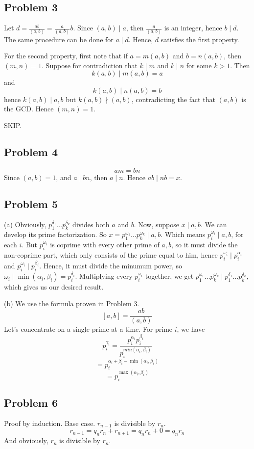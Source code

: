 \documentclass{book}
\begin{document}
\subsection*{Problem 3}
Let $d = \frac{ab}{(a, b)} = \frac{a}{(a, b)} b$. Since $(a, b) \mid a$, then $\frac{a}{(a, b)}$ is an integer, hence $b \mid d$. The same procedure can be done for $a \mid d$. Hence, $d$ satisfies the first property.

For the second property, first note that if $a = m(a, b)$ and $b = n(a, b)$, then $(m, n) = 1$. Suppose for contradiction that $k \mid m$ and $k \mid n$ for some $k > 1$. Then
$$k(a, b) \mid m(a, b) = a$$
and
$$k(a, b) \mid n(a, b) = b$$
hence $k(a, b) \mid a, b$ but $k(a, b) \nmid (a, b)$, contradicting the fact that $(a, b)$ is the GCD. Hence $(m, n) = 1$.

SKIP.

\subsection*{Problem 4}
$$am = bn$$
Since $(a, b) = 1$, and $a \mid bn$, then $a \mid n$. Hence $ab \mid nb = x$.

\subsection*{Problem 5}
(a)
Obviously, $p_1^{\delta_1} \ldots p_k^{\delta_k}$ divides both $a$ and $b$. Now, suppose $x \mid a, b$. We can develop its prime factorization. So $x = p_1^{\omega_1} \ldots p_k^{\omega_k} \mid a, b$. Which means $p_i^{\omega_i} \mid a, b$, for each $i$. But $p_i^{\omega_i}$ is coprime with every other prime of $a, b$, so it must divide the non-coprime part, which only consists of the prime equal to him, hence $p_i^{\omega_i} \mid p_i^{\alpha_i}$ and $p_i^{\omega_i} \mid p_i^{\beta_i}$. Hence, it must divide the minumum power, so $\omega_i \mid \min(\alpha_i, \beta_i) = p_i^{\delta_i}$. Multiplying every $p_i^{\omega_i}$ together, we get $p_1^{\omega_1} \ldots p_k^{\omega_k} \mid p_1^{\delta_1} \ldots p_k^{\delta_k}$, which gives us our desired result.

\noindent
(b)
We use the formula proven in Problem 3.
$$[a, b] = \frac{ab}{(a, b)}$$
Let's concentrate on a single prime at a time. For prime $i$, we have
$$p_i^{\gamma_i} = \frac{p_i^{\alpha_i} p_i^{\beta_i}}{p_i^{min(\alpha_i, \beta_i)}}$$
$$= p_i^{\alpha_i + \beta_i - \min(\alpha_i, \beta_i)}$$
$$= p_i^{\max(\alpha_i, \beta_i)}$$

\subsection*{Problem 6}
Proof by induction. Base case. $r_{n - 1}$ is divisible by $r_n$.
$$r_{n - 1} = q_n r_n + r_{n + 1} = q_n r_n + 0 = q_n r_n$$
And obviously, $r_n$ is divisible by $r_n$.
\end{document}
